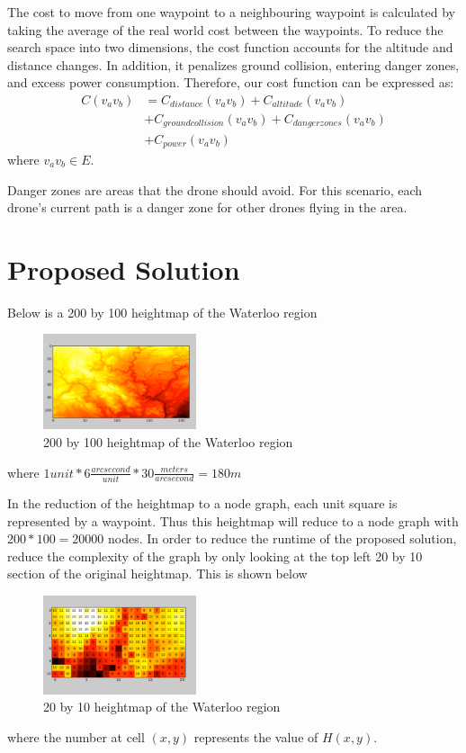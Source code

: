 \documentclass[conference]{IEEEtran}
\begin{document}
The cost to move from one waypoint to a neighbouring waypoint is calculated by taking the average of the real world cost between the waypoints. To reduce the search space into two dimensions, the cost function accounts for the altitude and distance changes. In addition, it penalizes ground collision, entering danger zones, and excess power consumption. Therefore, our cost function can be expressed as:
\begin{equation} \label{eq:cost}
\begin{split}
C(v_av_b) &= C_{distance}(v_av_b) + C_{altitude}(v_av_b) \\
&+ C_{ground collision}(v_av_b) + C_{danger zones}(v_av_b) \\
&+ C_{power}(v_av_b)
\end{split}
\end{equation}
where $v_av_b \in E$.

Danger zones are areas that the drone should avoid. For this scenario, each drone's current path is a danger zone for other drones flying in the area.

\section{Proposed Solution}
Below is a 200 by 100 heightmap of the Waterloo region
\begin{figure}[htbp] \label{img:heightmap1}
\centerline{\includegraphics[width=0.4\textwidth]{images/heightmap_orig.png}}
\caption{200 by 100 heightmap of the Waterloo region}
\label{fig}
\end{figure}
where $1 unit * 6 \frac{arcsecond}{unit} * 30 \frac{meters}{arcsecond} = 180m$

In the reduction of the heightmap to a node graph, each unit square is represented by a waypoint. Thus this heightmap will reduce to a node graph with $200 * 100 = 20000$ nodes. In order to reduce the runtime of the proposed solution, reduce the complexity of the graph by only looking at the top left 20 by 10 section of the original heightmap. This is shown below
\begin{figure}[htbp] \label{img:heightmap2}
\centerline{\includegraphics[width=0.4\textwidth]{images/heightmap.png}}
\caption{20 by 10 heightmap of the Waterloo region}
\label{fig}
\end{figure}
where the number at cell $(x, y)$ represents the value of $H(x, y)$.
\end{document}
